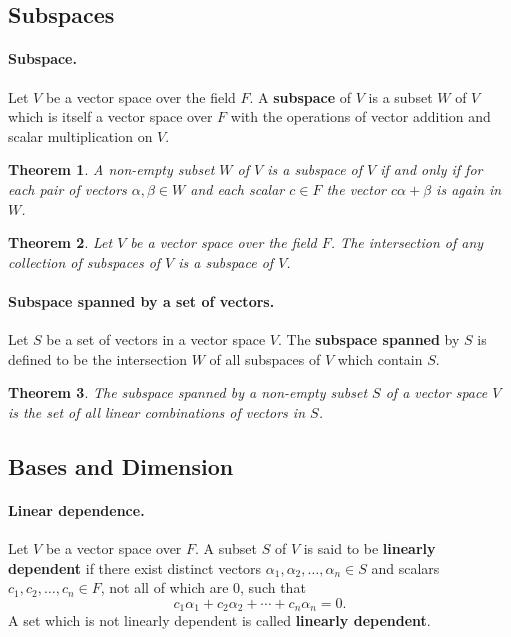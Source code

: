 \documentclass{article}
\newtheorem{theorem}{Theorem}[section]
\begin{document}
\subsection{Subspaces}

\paragraph{Subspace.} Let $V$ be a vector space over the field $F$. A
\textbf{subspace} of $V$ is a subset $W$ of $V$ which is itself a vector space
over $F$ with the operations of vector addition and scalar multiplication on
$V$.

\begin{theorem}
  A non-empty subset $W$ of $V$ is a subspace of $V$ if and only if for each
  pair of vectors $\alpha, \beta \in W$ and each scalar $c \in F$ the vector
  $c\alpha + \beta$ is again in $W$.
\end{theorem}

\begin{theorem}
  Let $V$ be a vector space over the field $F$. The intersection of any
  collection of subspaces of $V$ is a subspace of $V$.
\end{theorem}

\paragraph{Subspace spanned by a set of vectors.} Let $S$ be a set of vectors
in a vector space $V$. The \textbf{subspace spanned} by $S$ is defined to be
the intersection $W$ of all subspaces of $V$ which contain $S$.

\begin{theorem}
  The subspace spanned by a non-empty subset $S$ of a vector space $V$ is the
  set of all linear combinations of vectors in $S$.
\end{theorem}

\subsection{Bases and Dimension}

\paragraph{Linear dependence.} Let $V$ be a vector space over $F$. A subset $S$
of $V$ is said to be \textbf{linearly dependent} if there exist distinct vectors
$\alpha_1, \alpha_2, \ldots, \alpha_n \in S$ and scalars $c_1, c_2, \ldots, c_n
\in F$, not all of which are 0, such that \[
  c_1\alpha_1 + c_2\alpha_2 + \cdots + c_n\alpha_n = 0.
\] A set which is not linearly dependent is called \textbf{linearly dependent}.
\end{document}
